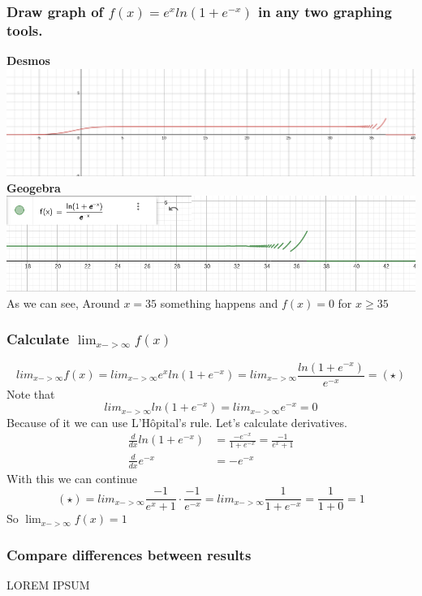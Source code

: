 \documentclass[12pt]{article}
\begin{document}
\subsubsection*{Draw graph of $f(x) = e^x ln(1+e^{-x})$ in any two graphing tools. }
\textbf{Desmos}\\
\includegraphics[scale=0.25]{ex2/desmos}\\
\textbf{Geogebra}\\
\includegraphics[scale=0.5]{ex2/geogebra}\\
As we can see, Around $x=35$ something happens and $f(x) = 0$ for $x \geq 35$
\subsubsection*{Calculate $\lim_{x->\infty} f(x)$}
$$lim_{x->\infty}f(x) = lim_{x->\infty} e^xln(1+e^{-x}) = lim_{x->\infty} \frac{ln(1+e^{-x})}{e^{-x}} = (\star)$$
Note that $$lim_{x->\infty} ln(1+e^{-x}) = lim_{x->\infty} e^{-x} = 0$$
Because of it we can use L'Hôpital's rule.  
Let's calculate derivatives.
\begin{align*} 
\frac{d}{dx}ln(1+e^{-x}) &= \frac{-e^{-x}}{1+e^{-x}} = \frac{-1}{e^x + 1} \\
\frac{d}{dx}e^{-x} &= -e^{-x}
\end{align*} 
With this we can continue
$$(\star) = lim_{x->\infty} \frac{-1}{e^x + 1} \cdot \frac{-1}{e^{-x}} = lim_{x->\infty} \frac{1}{1 + e^{-x}} = \frac{1}{1+0} = 1$$  
So $\lim_{x->\infty} f(x) = 1$
\subsubsection*{Compare differences between results}
LOREM IPSUM
\end{document}
